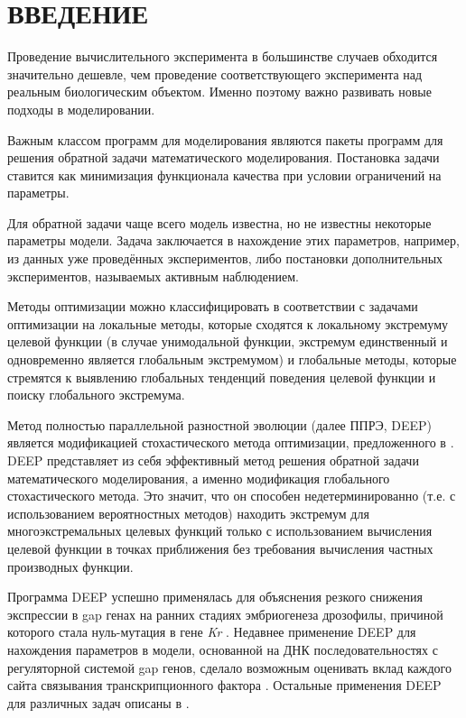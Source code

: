 \chapter*{ВВЕДЕНИЕ}

Проведение вычислительного эксперимента
в большинстве случаев обходится значительно дешевле,
чем проведение соответствующего эксперимента
над реальным биологическим объектом.
Именно поэтому важно развивать новые подходы в моделировании.

Важным классом программ для моделирования
являются пакеты программ
для решения обратной задачи математического моделирования.
Постановка задачи ставится
как минимизация функционала качества
при условии ограничений на параметры.

Для обратной задачи чаще всего модель известна,
но не известны некоторые параметры модели.
Задача заключается в нахождение этих параметров,
например, из данных уже проведённых экспериментов,
либо постановки дополнительных экспериментов,
называемых активным наблюдением.

Методы оптимизации можно классифицировать
в соответствии с задачами оптимизации
на локальные методы,
которые сходятся к локальному экстремуму целевой функции
(в случае унимодальной функции,
экстремум единственный и одновременно
является глобальным экстремумом)
и глобальные методы,
которые стремятся к выявлению
глобальных тенденций поведения целевой функции
и поиску глобального экстремума.

Метод полностью параллельной разностной эволюции
(далее ППРЭ, DEEP) \cite{Kozlov11, Kozlov13}
является модификацией стохастического метода оптимизации,
предложенного в \cite{Storn95}.
DEEP представляет из себя эффективный метод
решения обратной задачи математического моделирования,
а именно модификация глобального стохастического метода.
Это значит, что он способен недетерминированно
(т.е. с использованием вероятностных методов)
находить экстремум для многоэкстремальных целевых функций
только с использованием вычисления целевой функции
в точках приближения без требования вычисления частных производных функции.

Программа DEEP успешно применялась для объяснения
резкого снижения экспрессии в gap генах
на ранних стадиях эмбриогенеза дрозофилы,
причиной которого стала нуль-мутация в гене \textit{Kr} \cite{kozlov2012modeling}.
Недавнее применение DEEP для нахождения
параметров в модели, основанной на
ДНК последовательностях с
регуляторной системой gap генов,
сделало возможным оценивать
вклад каждого сайта связывания
транскрипционного фактора \cite{kozlov2014sequence}.
Остальные применения DEEP
для различных задач описаны в
\cite{kozlov2013enhanced, ivanisenko2014new,
ivanisenko2013replication, kozlov2015differential}.

